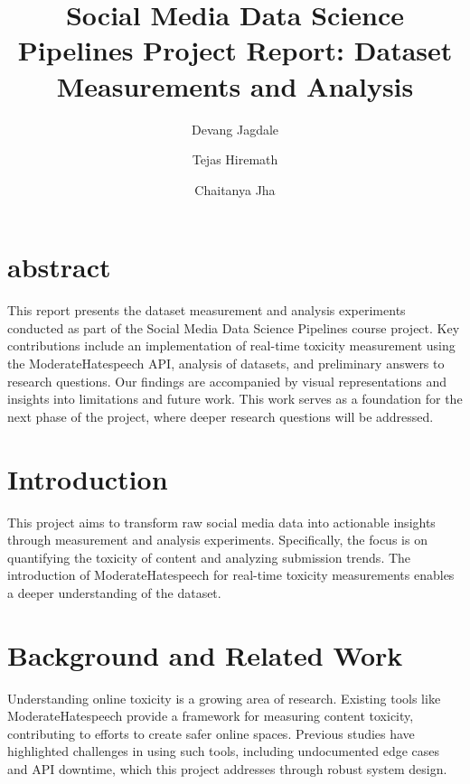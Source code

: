 \documentclass[sigconf]{acmart}
\begin{document}
\title{Social Media Data Science Pipelines Project Report: Dataset Measurements and Analysis}

\author{Devang Jagdale}

\author{Tejas Hiremath}

\author{Chaitanya Jha}

\maketitle

\section{abstract}
This report presents the dataset measurement and analysis experiments conducted as part of the Social Media Data Science Pipelines course project. Key contributions include an implementation of real-time toxicity measurement using the ModerateHatespeech API, analysis of datasets, and preliminary answers to research questions. Our findings are accompanied by visual representations and insights into limitations and future work. This work serves as a foundation for the next phase of the project, where deeper research questions will be addressed.

\section{Introduction}
This project aims to transform raw social media data into actionable insights through measurement and analysis experiments. Specifically, the focus is on quantifying the toxicity of content and analyzing submission trends. The introduction of ModerateHatespeech for real-time toxicity measurements enables a deeper understanding of the dataset.

\section{Background and Related Work}
Understanding online toxicity is a growing area of research. Existing tools like ModerateHatespeech provide a framework for measuring content toxicity, contributing to efforts to create safer online spaces. Previous studies have highlighted challenges in using such tools, including undocumented edge cases and API downtime, which this project addresses through robust system design.
\end{document}
